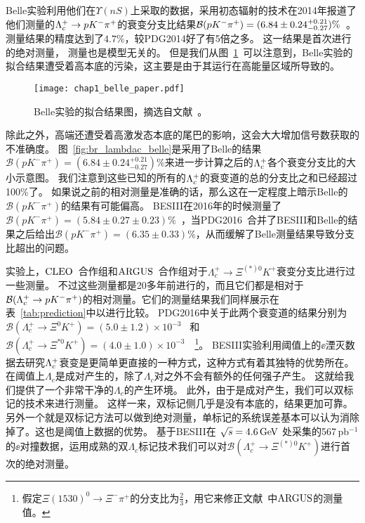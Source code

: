 Belle实验利用他们在$\Upsilon(nS)$上采取的数据，采用初态辐射的技术在2014年报道了他们测量的$\Lambda_{c}^{+}\rightarrow pK^{-}\pi^+$的衰变分支比结果$\mathcal{B}(pK^{-}\pi^+)=(6.84\pm0.24^{+0.21}_{-0.27})\%$~\cite{Lambdac_belle}。
测量结果的精度达到了$4.7\%$，较PDG2014好了有5倍之多。
这一结果是首次进行的绝对测量， 测量也是模型无关的。
但是我们从图~\ref{fig:bellepaper}~\cite{Lambdac_belle}可以注意到，Belle实验的拟合结果遭受着高本底的污染，这主要是由于其运行在高能量区域所导致的。
\begin{figure}[!tbp]
 \centering
 \texttt{[image: chap1\_belle\_paper.pdf]}
 \caption[Belle实验的拟合结果图。]{Belle实验的拟合结果图，摘选自文献~\cite{Lambdac_belle}。}
 \label{fig:bellepaper}
\end{figure}
除此之外，高端还遭受着高激发态本底的尾巴的影响，这会大大增加信号数获取的不准确度。
图~\ref{fig:br_lambdac_belle}是采用了Belle的结果$\mathcal{B}(pK^{-}\pi^{+})=(6.84\pm0.24^{+0.21}_{-0.27})\%$来进一步计算之后的$\Lambda_{c}^{+}$各个衰变分支比的大小示意图。
我们注意到这些已知的所有的$\Lambda_{c}^{+}$的衰变道的总的分支比之和已经超过100\%了。
如果说之前的相对测量是准确的话，那么这在一定程度上暗示Belle的$\mathcal{B}(pK^{-}\pi^{+})$的结果有可能偏高。
BESIII在2016年的时候测量了$\mathcal{B}(pK^{-}\pi^{+})=(5.84\pm0.27\pm0.23)\%$~\cite{Lambdac_bes3}，当PDG2016~\cite{PDG2017}合并了BESIII和Belle的结果之后给出$\mathcal{B}(pK^{-}\pi^{+})=(6.35\pm0.33)\%$，从而缓解了Belle测量结果导致分支比超出的问题。


实验上，$\mbox{CLEO}$~\cite{Avery:1993vj}合作组和$\mbox{ARGUS}$~\cite{Albrecht:1994hr}合作组对于$\Lambda^+_c\to \Xi^{(*)0}K^+$衰变分支比进行过一些测量。
不过这些测量都是20多年前进行的，而且它们都是相对于$\mathcal{B}(\Lambda_{c}^{+}\rightarrow pK^{-}\pi^+)$的相对测量。它们的测量结果我们同样展示在表~\ref{tab:prediction}中以进行比较。
PDG2016中关于此两个衰变道的结果分别为$\mathcal{B}(\Lambda^+_c\to\Xi^0K^+)=(5.0\pm1.2)\times10^{-3}$~\cite{PDG2017} 和 $\mathcal{B}(\Lambda^+_c\to\Xi^{*0}K^+)=(4.0\pm1.0)\times10^{-3}$~\cite{PDG2017}~\footnote{假定$\Xi(1530)^0\to\Xi^{-}\pi^{+}$的分支比为$\frac{2}{3}$，用它来修正文献~\cite{Albrecht:1994hr}中$\mbox{ARGUS}$的测量值。}。
BESIII实验利用阈值上的$\ee$湮灭数据去研究$\Lambda_{c}^{+}$衰变是更简单更直接的一种方式，这种方式有着其独特的优势所在。
在阈值上$\Lambda_c$是成对产生的，除了$\Lambda_c$对之外不会有额外的任何强子产生。
这就给我们提供了一个非常干净的$\Lambda_c$的产生环境。
此外，由于是成对产生，我们可以双标记的技术来进行测量。
这样一来，双标记侧几乎是没有本底的，结果更加可靠。
另外一个就是双标记方法可以做到绝对测量，单标记的系统误差基本可以认为消除掉了。这也是阈值上数据的优势。
基于BESIII在 $\sqrt{s}=4.6\mathrm{\,Ge\kern -0.1em V}$ 处采集的567\,pb$^{-1}$的$\ee$对撞数据，运用成熟的双$\Lambda_{c}$标记技术我们可以对$\mathcal{B}(\Lambda^+_c\to \Xi^{(*)0}K^+)$进行首次的绝对测量。


